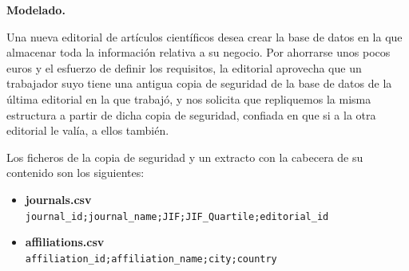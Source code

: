 \documentclass[
    12pt,
    a4paper,
    addpoints,
    answers,
    convocatoria=ext,
    titulacion=NoCD,
    curso=2023/2024,
]{db-exam}
\begin{document}
\begin{questions}

\question[3] \textbf{Modelado.}

Una nueva editorial de artículos científicos desea crear la base de datos en la que almacenar toda la información relativa a su negocio. Por ahorrarse unos pocos euros y el esfuerzo de definir los requisitos, la editorial aprovecha que un trabajador suyo tiene una antigua copia de seguridad de la base de datos de la última editorial en la que trabajó, y nos solicita que repliquemos la misma estructura a partir de dicha copia de seguridad, confiada en que si a la otra editorial le valía, a ellos también.

Los ficheros de la copia de seguridad y un extracto con la cabecera de su contenido son los siguientes:


\begin{itemize}
    
    \item \textbf{journals.csv} \vspace{0.5em} \\  
    \texttt{journal\_id;journal\_name;JIF;JIF\_Quartile;editorial\_id\\
    }
    
    \item \textbf{affiliations.csv} \vspace{0.5em} \\
    \texttt{affiliation\_id;affiliation\_name;city;country\\
    }
    

\end{itemize}
\end{questions}
\end{document}
